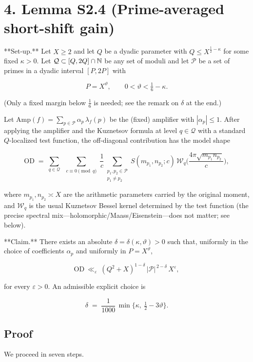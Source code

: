 \documentclass[11pt]{article}
\theoremstyle{definition}
\theoremstyle{remark}
\begin{document}
\section*{4. Lemma S2.4 (Prime-averaged short-shift gain)}

**Set-up.** Let $X\ge 2$ and let $Q$ be a dyadic parameter with $Q\le X^{\tfrac12-\kappa}$ for some fixed $\kappa>0$. Let $\mathcal Q\subset[Q,2Q]\cap\Bbb N$ be any set of moduli and let $\mathcal P$ be a set of primes in a dyadic interval $[P,2P]$ with

$$
P=X^{\vartheta},\qquad 0<\vartheta<\tfrac16-\kappa.
$$

(Only a fixed margin below $\tfrac16$ is needed; see the remark on $\delta$ at the end.)

Let $\mathrm{Amp}(f)=\sum_{p\in\mathcal P}\alpha_p\,\lambda_f(p)$ be the (fixed) amplifier with $|\alpha_p|\le 1$. After applying the amplifier and the Kuznetsov formula at level $q\in\mathcal Q$ with a standard $Q$-localized test function, the off-diagonal contribution has the model shape

$$
\mathrm{OD}\;=\;\sum_{q\in\mathcal Q}\;\sum_{\substack{c\equiv 0\pmod q}}\frac{1}{c}
\sum_{\substack{p_1,p_2\in\mathcal P\\p_1\ne p_2}}
\!S(m_{p_1},n_{p_2};c)\, \mathcal W_q\!\Big(\frac{4\pi\sqrt{m_{p_1}n_{p_2}}}{c}\Big),
$$

where $m_{p_1},n_{p_2}\asymp X$ are the arithmetic parameters carried by the original moment, and $\mathcal W_q$ is the usual Kuznetsov Bessel kernel determined by the test function (the precise spectral mix—holomorphic/Maass/Eisenstein—does not matter; see below).

**Claim.** There exists an absolute $\delta=\delta(\kappa,\vartheta)>0$ such that, uniformly in the choice of coefficients $\alpha_p$ and uniformly in $P=X^\vartheta$,

$$
\boxed{\quad
\mathrm{OD}\ \ll_\varepsilon\ (Q^2+X)^{1-\delta}\,|\mathcal P|^{\,2-\delta}\,X^\varepsilon,
\quad}
$$

for every $\varepsilon>0$. An admissible explicit choice is

$$
\delta\;=\;\frac{1}{1000}\,\min\!\Big\{\kappa,\ \tfrac12-3\vartheta\Big\}.
$$

\subsection*{Proof}

We proceed in seven steps.
\end{document}
